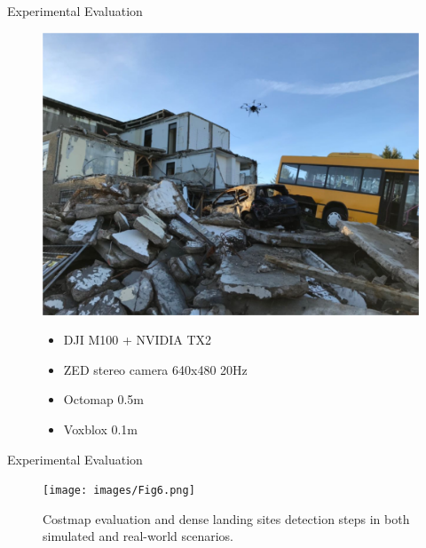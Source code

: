 \documentclass[10pt]{beamer}
\begin{document}
\begin{frame}{Experimental Evaluation}
\begin{figure}
\begin{minipage}{0.475\linewidth}
                \includegraphics[width=\textwidth]{images/Fig5b.png}
                \vspace{-0.25cm}
                {
                    \scriptsize
                    \begin{itemize}
                        \item DJI M100 + NVIDIA TX2
                        \item ZED stereo camera 640x480 20Hz
                        \item Octomap 0.5m
                        \item Voxblox 0.1m
                    \end{itemize}
                    \vspace{-0.15cm}
                }
            \end{minipage}
        \end{figure}
    \end{frame}

    \begin{frame}{Experimental Evaluation}
        \begin{figure}
            \caption{
                \justifying
                Costmap evaluation and dense landing sites detection steps
                in both simulated and real-world scenarios.}
            \vspace{-0.3cm}
            \texttt{[image: images/Fig6.png]}
        \end{figure}
    \end{frame}
\end{document}
